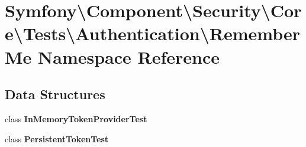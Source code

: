\section{Symfony\textbackslash{}Component\textbackslash{}Security\textbackslash{}Core\textbackslash{}Tests\textbackslash{}Authentication\textbackslash{}Remember\+Me Namespace Reference}
\label{namespace_symfony_1_1_component_1_1_security_1_1_core_1_1_tests_1_1_authentication_1_1_remember_me}
\subsection*{Data Structures}
\begin{DoxyCompactItemize}
\item 
class {\bf In\+Memory\+Token\+Provider\+Test}
\item 
class {\bf Persistent\+Token\+Test}
\end{DoxyCompactItemize}
